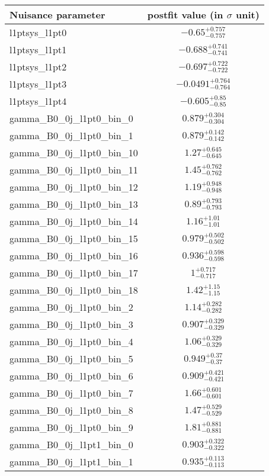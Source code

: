 
\begin{tabular}{|l|c|}
\hline
Nuisance parameter & postfit value (in $\sigma$ unit) \\\hline
l1ptsys\_l1pt0 & $-0.65^{+0.757}_{-0.757}$ \\
l1ptsys\_l1pt1 & $-0.688^{+0.741}_{-0.741}$ \\
l1ptsys\_l1pt2 & $-0.697^{+0.722}_{-0.722}$ \\
l1ptsys\_l1pt3 & $-0.0491^{+0.764}_{-0.764}$ \\
l1ptsys\_l1pt4 & $-0.605^{+0.85}_{-0.85}$ \\
gamma\_B0\_0j\_l1pt0\_bin\_0 & $0.879^{+0.304}_{-0.304}$ \\
gamma\_B0\_0j\_l1pt0\_bin\_1 & $0.879^{+0.142}_{-0.142}$ \\
gamma\_B0\_0j\_l1pt0\_bin\_10 & $1.27^{+0.645}_{-0.645}$ \\
gamma\_B0\_0j\_l1pt0\_bin\_11 & $1.45^{+0.762}_{-0.762}$ \\
gamma\_B0\_0j\_l1pt0\_bin\_12 & $1.19^{+0.948}_{-0.948}$ \\
gamma\_B0\_0j\_l1pt0\_bin\_13 & $0.89^{+0.793}_{-0.793}$ \\
gamma\_B0\_0j\_l1pt0\_bin\_14 & $1.16^{+1.01}_{-1.01}$ \\
gamma\_B0\_0j\_l1pt0\_bin\_15 & $0.979^{+0.502}_{-0.502}$ \\
gamma\_B0\_0j\_l1pt0\_bin\_16 & $0.936^{+0.598}_{-0.598}$ \\
gamma\_B0\_0j\_l1pt0\_bin\_17 & $1^{+0.717}_{-0.717}$ \\
gamma\_B0\_0j\_l1pt0\_bin\_18 & $1.42^{+1.15}_{-1.15}$ \\
gamma\_B0\_0j\_l1pt0\_bin\_2 & $1.14^{+0.282}_{-0.282}$ \\
gamma\_B0\_0j\_l1pt0\_bin\_3 & $0.907^{+0.329}_{-0.329}$ \\
gamma\_B0\_0j\_l1pt0\_bin\_4 & $1.06^{+0.329}_{-0.329}$ \\
gamma\_B0\_0j\_l1pt0\_bin\_5 & $0.949^{+0.37}_{-0.37}$ \\
gamma\_B0\_0j\_l1pt0\_bin\_6 & $0.909^{+0.421}_{-0.421}$ \\
gamma\_B0\_0j\_l1pt0\_bin\_7 & $1.66^{+0.601}_{-0.601}$ \\
gamma\_B0\_0j\_l1pt0\_bin\_8 & $1.47^{+0.529}_{-0.529}$ \\
gamma\_B0\_0j\_l1pt0\_bin\_9 & $1.81^{+0.881}_{-0.881}$ \\
gamma\_B0\_0j\_l1pt1\_bin\_0 & $0.903^{+0.322}_{-0.322}$ \\
gamma\_B0\_0j\_l1pt1\_bin\_1 & $0.935^{+0.113}_{-0.113}$ \\

\end{tabular}
